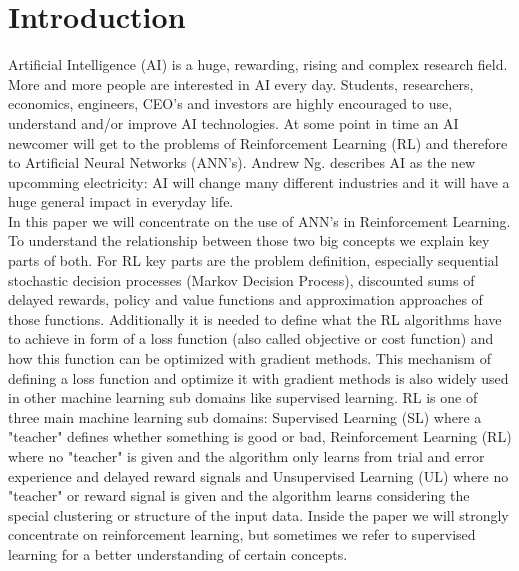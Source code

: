 \documentclass[conference]{IEEEtran}
\begin{document}


\section{Introduction}
Artificial Intelligence (AI) is a huge, rewarding, rising and complex research field. More and more people are interested in AI every day. Students, researchers, economics, engineers, CEO's and investors are highly encouraged to use, understand and/or improve AI technologies. At some point in time an AI newcomer will get to the problems of Reinforcement Learning (RL) and therefore to Artificial Neural Networks (ANN's). Andrew Ng. describes AI as the new upcomming electricity: AI will change many different industries and it will have a huge general impact in everyday life. \\

In this paper we will concentrate on the use of ANN's in Reinforcement Learning. To understand the relationship between those two big concepts we explain key parts of both. For RL key parts are the problem definition, especially sequential stochastic decision processes (Markov Decision Process), discounted sums of delayed rewards, policy and value functions and approximation approaches of those functions. Additionally it is needed to  define what the RL algorithms have to achieve in form of a loss function (also called objective or cost function) and how this function can be optimized with gradient methods. This mechanism of defining a loss function and optimize it with gradient methods is also widely used in other machine learning sub domains like supervised learning. RL is one of three main machine learning sub domains: Supervised Learning (SL) where a "teacher" defines whether something is good or bad, Reinforcement Learning (RL) where no "teacher" is given and the algorithm only learns from trial and error experience and delayed reward signals and Unsupervised Learning (UL) where no "teacher" or reward signal is given and the algorithm learns considering the special clustering or structure of the input data. Inside the paper we will strongly concentrate on reinforcement learning, but sometimes we refer to supervised learning for a better understanding of certain concepts.
\end{document}
